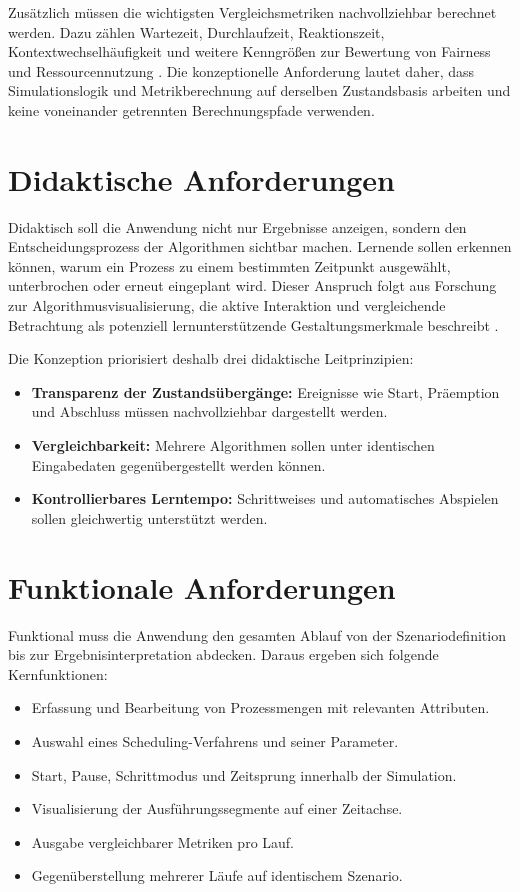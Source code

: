 Zusätzlich müssen die wichtigsten Vergleichsmetriken nachvollziehbar berechnet werden. Dazu zählen Wartezeit, Durchlaufzeit, Reaktionszeit, Kontextwechselhäufigkeit und weitere Kenngrößen zur Bewertung von Fairness und Ressourcennutzung \cite{pinedo2016scheduling}. Die konzeptionelle Anforderung lautet daher, dass Simulationslogik und Metrikberechnung auf derselben Zustandsbasis arbeiten und keine voneinander getrennten Berechnungspfade verwenden.

\section{Didaktische Anforderungen}

Didaktisch soll die Anwendung nicht nur Ergebnisse anzeigen, sondern den Entscheidungsprozess der Algorithmen sichtbar machen. Lernende sollen erkennen können, warum ein Prozess zu einem bestimmten Zeitpunkt ausgewählt, unterbrochen oder erneut eingeplant wird. Dieser Anspruch folgt aus Forschung zur Algorithmusvisualisierung, die aktive Interaktion und vergleichende Betrachtung als potenziell lernunterstützende Gestaltungsmerkmale beschreibt \cite{hundhausen2002meta,naps2002engagement,stasko1998software}.

Die Konzeption priorisiert deshalb drei didaktische Leitprinzipien:

\begin{itemize}
    \item \textbf{Transparenz der Zustandsübergänge:} Ereignisse wie Start, Präemption und Abschluss müssen nachvollziehbar dargestellt werden.
    \item \textbf{Vergleichbarkeit:} Mehrere Algorithmen sollen unter identischen Eingabedaten gegenübergestellt werden können.
    \item \textbf{Kontrollierbares Lerntempo:} Schrittweises und automatisches Abspielen sollen gleichwertig unterstützt werden.
\end{itemize}

\section{Funktionale Anforderungen}

Funktional muss die Anwendung den gesamten Ablauf von der Szenariodefinition bis zur Ergebnisinterpretation abdecken. Daraus ergeben sich folgende Kernfunktionen:

\begin{itemize}
    \item Erfassung und Bearbeitung von Prozessmengen mit relevanten Attributen.
    \item Auswahl eines Scheduling-Verfahrens und seiner Parameter.
    \item Start, Pause, Schrittmodus und Zeitsprung innerhalb der Simulation.
    \item Visualisierung der Ausführungssegmente auf einer Zeitachse.
    \item Ausgabe vergleichbarer Metriken pro Lauf.
    \item Gegenüberstellung mehrerer Läufe auf identischem Szenario.
\end{itemize}


